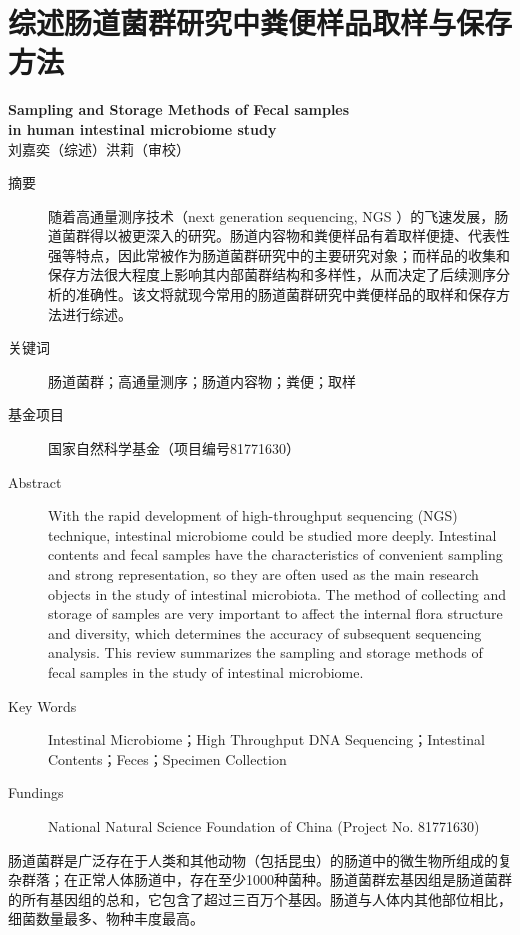 \chapter{综述\quad 肠道菌群研究中粪便样品取样与保存方法}
\label{app:review}

\begin{center} \textbf{Sampling and Storage Methods of Fecal samples \\ in human intestinal microbiome study}\\刘嘉奕（综述）\qquad 洪莉（审校）
\end{center}

\begin{description}
    \item[摘要] 随着高通量测序技术（next generation sequencing, NGS ）的飞速发展，肠道菌群得以被更深入的研究。肠道内容物和粪便样品有着取样便捷、代表性强等特点，因此常被作为肠道菌群研究中的主要研究对象；而样品的收集和保存方法很大程度上影响其内部菌群结构和多样性，从而决定了后续测序分析的准确性。该文将就现今常用的肠道菌群研究中粪便样品的取样和保存方法进行综述。
    \item[关键词] 肠道菌群；高通量测序；肠道内容物；粪便；取样
    \item[基金项目] 国家自然科学基金（项目编号81771630）
    \item[Abstract]With the rapid development of high-throughput sequencing (NGS) technique, intestinal microbiome could be studied more deeply. Intestinal contents and fecal samples have the characteristics of convenient sampling and strong representation, so they are often used as the main research objects in the study of intestinal microbiota. The method of collecting and storage of samples are very important to affect the internal flora structure and diversity, which determines the accuracy of subsequent sequencing analysis. This review summarizes the sampling and storage methods of fecal samples in the study of intestinal microbiome.
    \item[Key Words]Intestinal Microbiome；High Throughput DNA Sequencing；Intestinal Contents；Feces；Specimen Collection
    \item[Fundings]National Natural Science Foundation of China (Project No. 81771630)
\end{description}


肠道菌群是广泛存在于人类和其他动物（包括昆虫）的肠道中的微生物所组成的复杂群落；在正常人体肠道中，存在至少1000种菌种。肠道菌群宏基因组是肠道菌群的所有基因组的总和，它包含了超过三百万个基因\cite{Saxena2016}。肠道与人体内其他部位相比，细菌数量最多、物种丰度最高\cite{Willey2013}。


